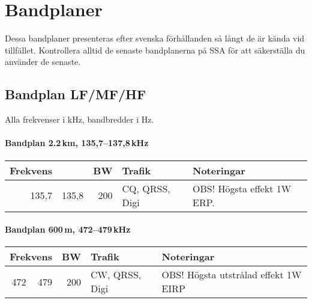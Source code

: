 

\onecolumn

\chapter{Bandplaner}
\label{bandplaner2}

\noindent Dessa bandplaner presenteras efter svenska förhållanden så långt de är kända vid tillfället. Kontrollera alltid de senaste bandplanerna på SSA för att säkerställa du använder de senaste.

\section{Bandplan LF/MF/HF}

Alla frekvenser i kHz, bandbredder i Hz.

\subsubsection{Bandplan 2.2\,km, 135,7--137,8\,kHz}
\begin{tabular}{rrrll}
\textbf{Frekvens} &  & \textbf{BW} & \textbf{Trafik} & \textbf{Noteringar} \\ \hline
135,7 & 135,8 & 200 & CQ, QRSS, Digi & OBS! Högsta effekt 1W ERP. \\ \hline
\end{tabular}

\subsubsection{Bandplan 600\,m, 472--479\,kHz}
\begin{tabular}{rrrll}
\multicolumn{2}{c}{\textbf{Frekvens}} & \textbf{BW} & \textbf{Trafik} & \textbf{Noteringar} \\ \hline
472 & 479 & 200 & CW, QRSS, Digi & OBS! Högsta utstrålad effekt 1W EIRP \\ \hline
\end{tabular}

